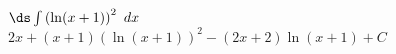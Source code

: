 {$\ds \int \left(\ln (x+1)\right)^2\ dx$}
{$2 x+(x+1)\left(\ln (x+1)\right)^2-(2 x+2)\ln (x+1)+C$
}

